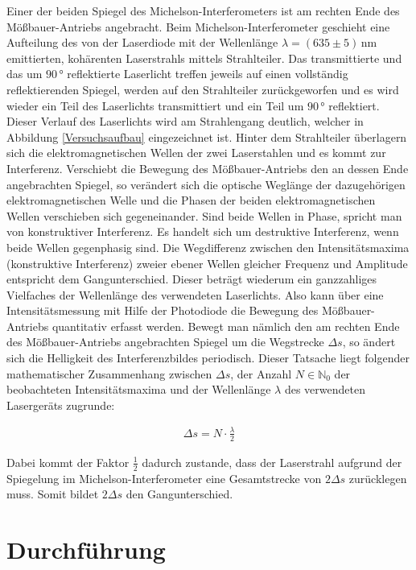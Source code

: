 \documentclass[
a4paper,                %
titlepage=firstiscover, %
captions=tableheading,  %
toc=bibliography,       %
toc=listof,             %
oneside,                %
automark,               %
12pt,                   %
english, ngerman,       %
parskip = half,         %
]{scrartcl}
\begin{document}
Einer der beiden Spiegel des Michelson-Interferometers ist am rechten Ende des Mößbauer-Antriebs angebracht.
Beim Michelson-Interferometer geschieht eine Aufteilung des von der Laserdiode mit der Wellenlänge $\lambda=(635\pm 5)\,$nm emittierten, kohärenten Laserstrahls mittels Strahlteiler.
Das transmittierte und das um $90\,$° reflektierte Laserlicht treffen jeweils auf einen vollständig reflektierenden Spiegel, werden auf den Strahlteiler zurückgeworfen und es wird wieder ein Teil des Laserlichts transmittiert und ein Teil um $90\,$° reflektiert.
Dieser Verlauf des Laserlichts wird am Strahlengang deutlich, welcher in Abbildung \ref{Versuchsaufbau} eingezeichnet ist.
Hinter dem Strahlteiler überlagern sich die elektromagnetischen Wellen der zwei Laserstahlen und es kommt zur Interferenz.
Verschiebt die Bewegung des Mößbauer-Antriebs den an dessen Ende angebrachten Spiegel, so verändert sich die optische Weglänge der dazugehörigen elektromagnetischen Welle und die Phasen der beiden elektromagnetischen Wellen verschieben sich gegeneinander.
Sind beide Wellen in Phase, spricht man von konstruktiver Interferenz.
Es handelt sich um destruktive Interferenz, wenn beide Wellen gegenphasig sind.
Die Wegdifferenz zwischen den Intensitätsmaxima (konstruktive Interferenz) zweier ebener Wellen gleicher Frequenz und Amplitude entspricht dem Gangunterschied.
Dieser beträgt wiederum ein ganzzahliges Vielfaches der Wellenlänge des verwendeten Laserlichts.
Also kann über eine Intensitätsmessung mit Hilfe der Photodiode die Bewegung des Mößbauer-Antriebs quantitativ erfasst werden.
Bewegt man nämlich den am rechten Ende des Mößbauer-Antriebs angebrachten Spiegel um die Wegstrecke $\Delta s$, so ändert sich die Helligkeit des Interferenzbildes periodisch.
Dieser Tatsache liegt folgender mathematischer Zusammenhang zwischen $\Delta s$, der Anzahl $N\in\mathbb{N}_{0}$ der beobachteten Intensitätsmaxima und der Wellenlänge $\lambda$ des verwendeten Lasergeräts zugrunde:

\begin{align}
\Delta s = N\cdot\frac{\lambda}{2}
\end{align}

\noindent Dabei kommt der Faktor $\frac{1}{2}$ dadurch zustande, dass der Laserstrahl aufgrund der Spiegelung im Michelson-Interferometer eine Gesamtstrecke von $2\Delta s$ zurücklegen muss.
Somit bildet $2\Delta s$ den Gangunterschied.


\newpage


\section{Durchführung}
\end{document}
